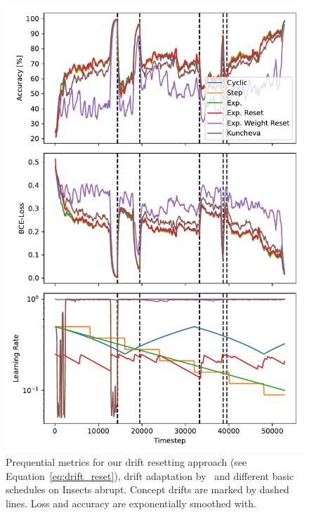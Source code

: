 \documentclass[letterpaper]{article} %
\begin{document}
\begin{figure}
	\centering
	\includegraphics[width=.47\textwidth]{figures/lr_norms_schedules_insects_abrupt.pdf}
	\caption{Prequential metrics for our drift resetting approach (see Equation~\eqref{eq:drift_reset}), drift adaptation by~\citet{kunchevaAdaptiveLearningRate2008} and different basic schedules on Insects abrupt. Concept drifts are marked by dashed lines. Loss and accuracy are exponentially smoothed with.}
	\label{fig:prequential_schedulers_insects}
\end{figure}
\end{document}
